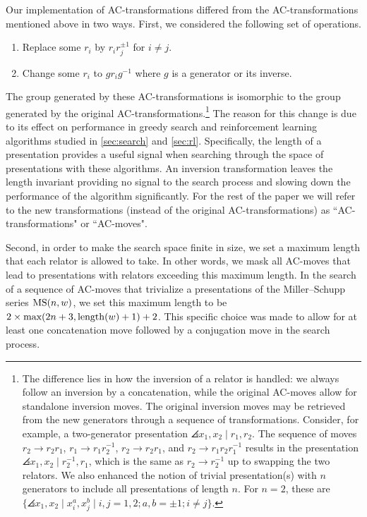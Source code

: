 Our implementation of AC-transformations differed from the AC-transformations mentioned above in two ways.
First, we considered the following set of operations.
\begin{enumerate}[label=(AC$'$\arabic*)]
	\item Replace some $r_i$ by $r_i r_j^{\pm 1}$ for $i \neq j$.
	\item Change some $r_i$ to $g r_i g^{-1}$ where $g$ is a generator or its inverse.
\end{enumerate}
The group generated by these AC-transformations is isomorphic to the group generated by the original AC-transformations.\footnote{
The difference lies in how the inversion of a relator is handled: we always follow an inversion by a concatenation, while the original AC-moves allow for standalone inversion moves.
The original inversion moves may be retrieved from the new generators through a sequence of transformations.
Consider, for example, a two-generator presentation $\angles{x_1, x_2 \mid r_1, r_2}$. The sequence of moves $r_2 \to r_2 r_1$, $r_1 \to r_1 r_2^{-1}$, $r_2 \to r_2 r_1$, and $r_2 \to r_1 r_2 r_1^{-1}$ results in the presentation $\angles{x_1, x_2 \mid r_2^{-1}, r_1}$, which is the same as $r_2 \to r_2^{-1}$ up to swapping the two relators.
We also enhanced the notion of trivial presentation(s) with $n$ generators to include all presentations of length $n$. For $n=2$, these are $\{\angles{x_1, x_2 \mid x_i^{a}, x_j^{b}} \mid i, j = 1, 2; a, b = \pm 1; i \neq j \}$.
}
The reason for this change is due to its effect on performance in greedy search and reinforcement learning algorithms studied in \cref{sec:search} and \cref{sec:rl}.
Specifically, the length of a presentation provides a useful signal when searching through the space of presentations with these algorithms.
An inversion transformation leaves the length invariant providing no signal to the search process and slowing down the performance of the algorithm significantly.
For the rest of the paper we will refer to the new transformations (instead of the original AC-transformations) as ``AC-transformations" or ``AC-moves".

Second, in order to make the search space finite in size, we set a maximum length that each relator is allowed to take. In other words, we mask all AC-moves that lead to presentations with relators exceeding this maximum length.
In the search of a sequence of AC-moves that trivialize a presentations of the Miller--Schupp series $\text{MS}(n, w)$, we set this maximum length to be $2 \times \text{max}(2 n+3, \operatorname{length}(w)+1) + 2$.
This specific choice was made to allow for at least one concatenation move followed by a conjugation move in the search process.
